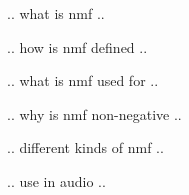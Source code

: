 .. what is nmf ..

.. how is nmf defined ..

.. what is nmf used for ..

.. why is nmf non-negative ..

.. different kinds of nmf ..

.. use in audio ..
